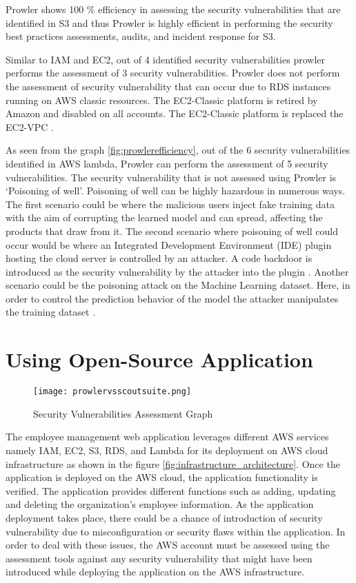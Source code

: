 \par Prowler shows 100 \% efficiency in assessing the security vulnerabilities that are identified in S3 and thus Prowler is highly efficient in performing the security best practices assessments, audits, and incident response for S3.

\par Similar to IAM and EC2, out of 4 identified security
vulnerabilities prowler performs the assessment of 3 security vulnerabilities.
Prowler does not perform the assessment of security vulnerability that can occur due to RDS instances running on AWS classic resources.
The EC2-Classic platform is retired by Amazon and disabled on all accounts.
The EC2-Classic platform is replaced the EC2-VPC \cite{88}.

\par As seen from the graph \ref{fig:prowlerefficiency}, out of the 6 security vulnerabilities identified in AWS lambda, Prowler can perform the assessment of 5 security vulnerabilities.
The security vulnerability that is not assessed using Prowler is ‘Poisoning of well’.
Poisoning of well can be highly hazardous in numerous ways.
The first scenario could be where the malicious users inject fake training data with the aim of corrupting the learned model and can spread, affecting the products that draw from it.
The second scenario where poisoning of well could occur would be where an Integrated Development Environment (IDE) plugin hosting the cloud server is controlled by an attacker.
A code backdoor is introduced as the security vulnerability by the attacker into the plugin \cite{89}.
Another scenario could be the poisoning attack on the Machine Learning dataset.
Here, in order to control the prediction behavior of the model the attacker manipulates the training dataset \cite{90}.


\section{Using Open-Source Application}

\begin{figure}
    \centering
    \texttt{[image: prowlervsscoutsuite.png]}
    \caption{Security Vulnerabilities Assessment Graph}
    \label{fig:prowlervsscoutsuite}
\end{figure}

\par The employee management web application \cite{69} leverages different AWS services namely IAM, EC2, S3, RDS, and Lambda for its deployment on AWS cloud infrastructure as shown in the figure \ref{fig:infrastructure_architecture}.
Once the application is deployed on the AWS cloud, the application functionality is verified.
The application provides different functions such as adding, updating and deleting the organization’s employee information.
As the application deployment takes place, there could be a chance of introduction of security vulnerability due to misconfiguration or security flaws within the application.
In order to deal with these issues, the AWS account must be assessed using the assessment tools against any security vulnerability that might have been introduced while deploying the application on the AWS infrastructure.

